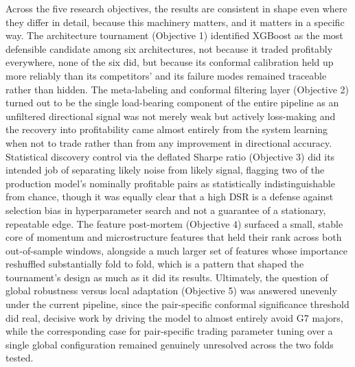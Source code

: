 \documentclass[12pt, a4paper]{article}
\begin{document}
Across the five research objectives, the results are consistent in shape even where they differ in detail, because this machinery matters, and it matters in a specific way. The 
architecture tournament (Objective 1) identified XGBoost as the most defensible candidate among six architectures, not because it traded profitably everywhere, none of the six 
did, but because its conformal calibration held up more reliably than its competitors' and its failure modes remained traceable rather than hidden. The meta-labeling and conformal 
filtering layer (Objective 2) turned out to be the single load-bearing component of the entire pipeline as an unfiltered directional signal was not merely weak but actively 
loss-making and the recovery into profitability came almost entirely from the system learning when not to trade rather than from any improvement in directional accuracy. Statistical 
discovery control via the deflated Sharpe ratio (Objective 3) did its intended job of separating likely noise from likely signal, flagging two of the production model's nominally 
profitable pairs as statistically indistinguishable from chance, though it was equally clear that a high DSR is a defense against selection bias in hyperparameter search and not a 
guarantee of a stationary, repeatable edge. The feature post-mortem (Objective 4) surfaced a small, stable core of momentum and microstructure features that held their rank across 
both out-of-sample windows, alongside a much larger set of features whose importance reshuffled substantially fold to fold, which is a pattern that shaped the tournament's design as 
much as it did its results. Ultimately, the question of global robustness versus local adaptation (Objective 5) was answered unevenly under the current pipeline, since the 
pair-specific conformal significance threshold did real, decisive work by driving the model to almost entirely avoid G7 majors, while the corresponding case for pair-specific 
trading parameter tuning over a single global configuration remained genuinely unresolved across the two folds tested.

\medskip
\end{document}
